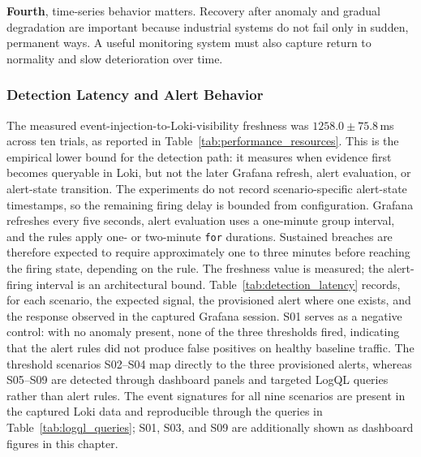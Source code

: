 \documentclass[12pt,a4paper]{article}
\begin{document}
\textbf{Fourth}, time-series behavior matters. Recovery after anomaly and
gradual degradation are important because industrial systems do not fail only in
sudden, permanent ways. A useful monitoring system must also capture return to
normality and slow deterioration over time.

\subsubsection{Detection Latency and Alert Behavior}
The measured event-injection-to-Loki-visibility freshness was
$1258.0 \pm 75.8$\,ms across ten trials, as reported in
Table~\ref{tab:performance_resources}. This is the empirical lower bound for
the detection path: it measures when evidence first becomes queryable in Loki,
but not the later Grafana refresh, alert evaluation, or alert-state transition.
The experiments do not record scenario-specific alert-state timestamps, so the
remaining firing delay is bounded from configuration. Grafana refreshes every
five seconds, alert evaluation uses a one-minute group interval, and the rules
apply one- or two-minute \texttt{for} durations. Sustained breaches are
therefore expected to require approximately one to three minutes before
reaching the firing state, depending on the rule. The freshness value is
measured; the alert-firing interval is an architectural bound.
Table~\ref{tab:detection_latency} records, for each scenario, the expected signal,
the provisioned alert where one exists, and the response observed in the captured
Grafana session. S01 serves as a negative control: with no anomaly present, none
of the three thresholds fired, indicating that the alert rules did not produce
false positives on healthy baseline traffic. The threshold scenarios S02--S04 map
directly to the three provisioned alerts, whereas S05--S09 are detected through
dashboard panels and targeted LogQL queries rather than alert rules. The event
signatures for all nine scenarios are present in the captured Loki data and
reproducible through the queries in Table~\ref{tab:logql_queries}; S01, S03, and
S09 are additionally shown as dashboard figures in this chapter.
\end{document}
